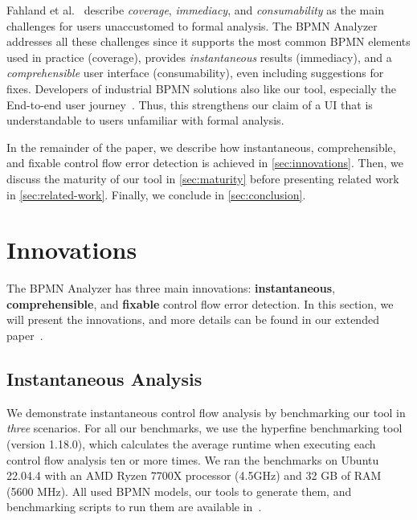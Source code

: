 \documentclass[
onecolumn, %
]{ceurart}
\begin{document}
Fahland et al.~\cite{fahlandAnalysisDemandInstantaneous2011} describe \textit{coverage}, \textit{immediacy}, and \textit{consumability} as the main challenges for users unaccustomed to formal analysis.
The BPMN Analyzer addresses all these challenges since it supports the most common BPMN elements used in practice (coverage), provides \textit{instantaneous} results (immediacy), and a \textit{comprehensible} user interface (consumability), even including suggestions for fixes.
Developers of industrial BPMN solutions also like our tool, especially the End-to-end user journey~\cite{krauterInstantaneousComprehensibleFixable2024}.
Thus, this strengthens our claim of a UI that is understandable to users unfamiliar with formal analysis.

In the remainder of the paper, we describe how instantaneous, comprehensible, and fixable control flow error detection is achieved in \autoref{sec:innovations}.
Then, we discuss the maturity of our tool in \autoref{sec:maturity} before presenting related work in \autoref{sec:related-work}.
Finally, we conclude in \autoref{sec:conclusion}.

\section{Innovations} \label{sec:innovations} %
The BPMN Analyzer has three main innovations: \textbf{instantaneous}, \textbf{comprehensible}, and \textbf{fixable} control flow error detection.
In this section, we will present the innovations, and more details can be found in our extended paper~\cite{krauterInstantaneousComprehensibleFixable2024}.

\subsection{Instantaneous Analysis}

We demonstrate instantaneous control flow analysis by benchmarking our tool in \textit{three} scenarios.
For all our benchmarks, we use the hyperfine benchmarking tool \cite{peterHyperfine2023} (version 1.18.0), which calculates the average runtime when executing each control flow analysis ten or more times.
We ran the benchmarks on Ubuntu 22.04.4 with an AMD Ryzen 7700X processor (4.5GHz) and 32 GB of RAM (5600 MHz).
All used BPMN models, our tools to generate them, and benchmarking scripts to run them are available in~\cite{krauterInstantaneousComprehensibleFixable2024}.
\end{document}
